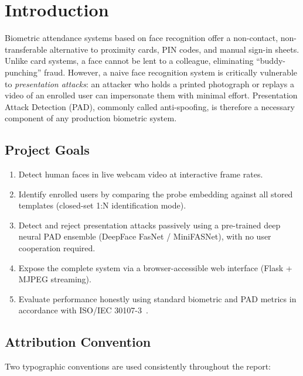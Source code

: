 \documentclass[11pt,a4paper]{article}
\begin{document}
\section{Introduction}
\label{sec:introduction}

Biometric attendance systems based on face recognition offer a non-contact,
non-transferable alternative to proximity cards, PIN codes, and manual sign-in
sheets.
Unlike card systems, a face cannot be lent to a colleague, eliminating
``buddy-punching'' fraud.
However, a naive face recognition system is critically vulnerable to
\emph{presentation attacks}: an attacker who holds a printed photograph or replays
a video of an enrolled user can impersonate them with minimal effort.
Presentation Attack Detection (PAD), commonly called anti-spoofing, is therefore a
necessary component of any production biometric system.

\subsection{Project Goals}

\begin{enumerate}[label=\arabic*.]
  \item Detect human faces in live webcam video at interactive frame rates.
  \item Identify enrolled users by comparing the probe embedding against all
        stored templates (closed-set 1:N identification mode).
  \item Detect and reject presentation attacks passively using a pre-trained deep
        neural PAD ensemble (DeepFace FasNet / MiniFASNet), with no user
        cooperation required.
  \item Expose the complete system via a browser-accessible web interface
        (Flask + MJPEG streaming).
  \item Evaluate performance honestly using standard biometric and PAD metrics
        in accordance with ISO/IEC 30107-3~\cite{iso30107}.
\end{enumerate}

\subsection{Attribution Convention}

Two typographic conventions are used consistently throughout the report:
\end{document}

